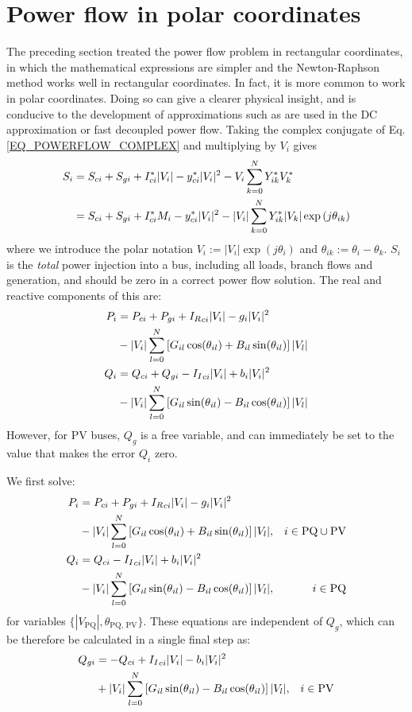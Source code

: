 \documentclass[10pt]{article}
\newcommand{\Ir}{{I_R}}
\newcommand{\Ii}{{I_I}}
\begin{document}
\section{Power flow in polar coordinates}
The preceding section treated the power flow problem in rectangular coordinates, in which the mathematical expressions are simpler and the Newton-Raphson method works well in rectangular coordinates. In fact, it is more common to work in polar coordinates. Doing so can give a clearer physical insight, and is conducive to the development of approximations such as are used in the DC approximation or fast decoupled power flow. Taking the complex conjugate of Eq. \ref{EQ_POWERFLOW_COMPLEX} and multiplying by $V_i$ gives
\newcommand{\M}[1]{\ensuremath{|V_{#1}|}}
\newcommand{\cs}[1]{\ensuremath{\cos(\theta_{#1})}}
\newcommand{\sn}[1]{\ensuremath{\sin(\theta_{#1})}}
\begin{align}
	S_i &= S_{ci} + S_{gi} + I^*_{ci}\M{i} - y^*_{ci}\M{i}^2 - V_i\sum_{k = 0}^N{Y^*_{ik}V^*_k} \notag \\
	&= S_{ci} + S_{gi} + I^*_{ci}M_i - y^*_{ci}\M{i}^2 - \M{i}\sum_{k = 0}^N{Y^*_{ik}\M{k}\exp{(j\theta_{ik})}}
\end{align}
where we introduce the polar notation $V_i := \M{i} \exp{(j\theta_i)}$ and $\theta_{ik} := \theta_i - \theta_k$. $S_i$ is the \emph{total} power injection into a bus, including all loads, branch flows and generation, and should be zero in a correct power flow solution. The real and reactive components of this are:
\begin{align}
	P_i &= P_{ci} + P_{gi} + \Ir_{ci}\M{i} - g_i\M{i}^2 \notag \\
	&- \M{i}\sum_{l = 0}^N{\left[G_{il}\cs{il} + B_{il}\sn{il}\right]\M{l}} \notag \\
	Q_i &= Q_{ci} + Q_{gi} - \Ii_{ci}\M{i} + b_i\M{i}^2 \notag \\
	&- \M{i}\sum_{l = 0}^N{\left[G_{il}\sn{il} - B_{il}\cs{il}\right]\M{l}} \notag \\
\end{align}
However, for PV buses, $Q_{g}$ is a free variable, and can immediately be set to the value that makes the error $Q_i$ zero.

We first solve:
\begin{align}
	P_i &= P_{ci} + P_{gi} + \Ir_{ci}\M{i} - g_i\M{i}^2 \notag \\
	&- \M{i}\sum_{l = 0}^N{\left[G_{il}\cs{il} + B_{il}\sn{il}\right]\M{l}}  , & i \in \mathrm{PQ} \cup \mathrm{PV}\notag \\
	Q_i &= Q_{ci} - \Ii_{ci}\M{i} + b_i\M{i}^2 \notag \\
	&- \M{i}\sum_{l = 0}^N{\left[G_{il}\sn{il} - B_{il}\cs{il}\right]\M{l}}, & i \in \mathrm{PQ}
\end{align}
for variables $\{\M{\text{PQ}}, \theta_\text{PQ, PV}\}$. These equations are independent of $Q_g$, which can be therefore be calculated in a single final step as:
\begin{align}
	Q_{gi} &= -Q_{ci} + \Ii_{ci}\M{i} - b_i\M{i}^2 \notag \\
	&+ \M{i}\sum_{l = 0}^N{\left[G_{il}\sn{il} - B_{il}\cs{il}\right]\M{l}}, & i \in \mathrm{PV}
\end{align}
\end{document}

